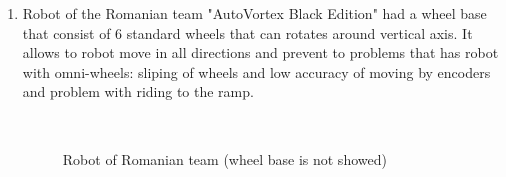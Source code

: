 \begin{enumerate}
\begin{enumerate}
		\item Robot of the Romanian team "AutoVortex Black Edition" had a wheel base that consist of 6 standard wheels that can rotates around vertical axis. It allows to robot move in all directions and prevent to problems that has robot with omni-wheels: sliping of wheels and low accuracy of moving by encoders and problem with riding to the ramp.
		\begin{figure}[H]
			\begin{minipage}[h]{0.2\linewidth}
				\center  
			\end{minipage}
			\begin{minipage}[h]{0.6\linewidth}
				\caption{Robot of Romanian team (wheel base is not showed)}
			\end{minipage}
		\end{figure}
		

\end{enumerate}
\end{enumerate}
